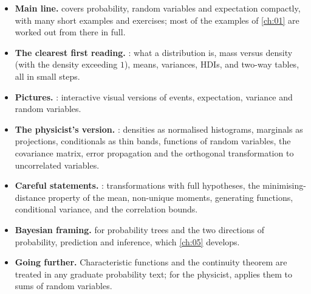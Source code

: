 \begin{itemize}[leftmargin=1.2em,itemsep=2pt]
  \item \textbf{Main line.}  covers probability, random
        variables and expectation compactly, with many short examples and
        exercises; most of the examples of \cref{ch:01} are worked out from
        there in full.
  \item \textbf{The clearest first reading.} : what a
        distribution is, mass versus density (with the density exceeding $1$),
        means, variances, HDIs, and two-way tables, all in small steps.
  \item \textbf{Pictures.} : interactive
        visual versions of events, expectation, variance and random
        variables.
  \item \textbf{The physicist's version.} : densities as
        normalised histograms, marginals as projections, conditionals as thin
        bands, functions of random variables, the covariance matrix, error
        propagation and the orthogonal transformation to uncorrelated
        variables.
  \item \textbf{Careful statements.} :
        transformations with full hypotheses, the minimising-distance
        property of the mean, non-unique moments, generating functions,
        conditional variance, and the correlation bounds.
  \item \textbf{Bayesian framing.}  for probability
        trees and the two directions of probability, prediction and
        inference, which \cref{ch:05} develops.
  \item \textbf{Going further.} Characteristic functions and the continuity
        theorem are treated in any graduate probability text; for the
        physicist,  applies them to sums of random
        variables.
\end{itemize}
  